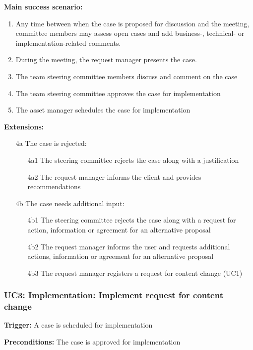 	\textbf{Main success scenario:}
	
	\begin{enumerate}
		\item Any time between when the case is proposed for discussion and the meeting, committee members may assess open cases and add business-, technical- or implementation-related comments. 
		\item During the meeting, the request manager presents the case.
		\item The team steering committee members discuss and comment on the case
		\item The team steering committee approves the case for implementation
		\item The asset manager schedules the case for implementation		
	\end{enumerate}
	\textbf{Extensions:}
	\begin{enumerate}
		\item [4a] The case is rejected:
		\begin{enumerate}
			\item [4a1] The steering committee rejects the case along with a justification
			\item [4a2] The request manager informs the client and provides recommendations			
		\end{enumerate}
		\item [4b] The case needs additional input:
		\begin{enumerate}
			\item [4b1]  The steering committee rejects the case along with a request for action, information or agreement for an alternative proposal
			\item [4b2] The request manager informs the user and requests additional actions, information or agreement for an alternative proposal
			\item [4b3] The request manager registers a request for content change (UC1)
		\end{enumerate}
	\end{enumerate}

	\subsubsection{UC3: Implementation: Implement request for content change}
	\label{sec:uc3}
	
	\textbf{Trigger:} A case is scheduled for implementation
	
	\textbf{Preconditions:} The case is approved for implementation
	
